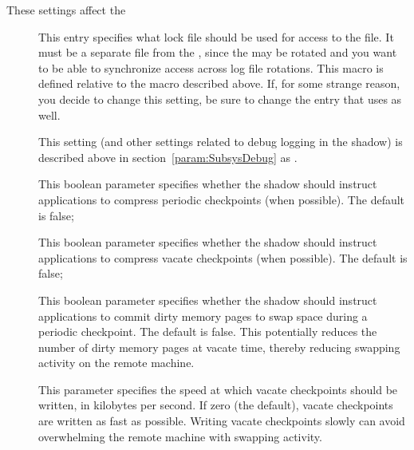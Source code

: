 These settings affect the 
\begin{description}

\item[] \label{param:ShadowLock} This entry
  specifies what lock file should be used for access to the
   file.  It must be a separate file from the
  , since the  may be rotated and you
  want to be able to synchronize access across log file rotations.
  This macro is defined relative to the  macro described
  above.  If, for some strange reason, you decide to change this
  setting, be sure to change the  entry that
   uses as well.

\item[] \label{param:ShadowDebug} This setting
  (and other settings related to debug logging in the shadow) is
  described above in section~\ref{param:SubsysDebug} as
  .

\item[]
  \label{param:CompressPeriodicCkpt} This boolean parameter specifies
  whether the shadow should instruct applications to compress periodic
  checkpoints (when possible).  The default is false;

\item[]
  \label{param:CompressVacateCkpt} This boolean parameter specifies
  whether the shadow should instruct applications to compress vacate
  checkpoints (when possible).  The default is false;

\item[] \label{param:PeriodicMemorySync}
  This boolean parameter specifies whether the shadow should instruct
  applications to commit dirty memory pages to swap space during a
  periodic checkpoint.  The default is false.  This potentially
  reduces the number of dirty memory pages at vacate time, thereby
  reducing swapping activity on the remote machine.

\item[] \label{param:SlowCkptSpeed}  This
  parameter specifies the speed at which vacate checkpoints should be
  written, in kilobytes per second.  If zero (the default), vacate
  checkpoints are written as fast as possible.  Writing vacate
  checkpoints slowly can avoid overwhelming the remote machine with
  swapping activity.

\end{description}

